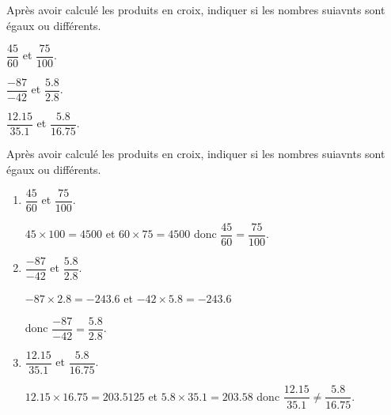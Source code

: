 \begin{exercice*}
    Après avoir calculé les produits en croix, indiquer si les nombres suiavnts sont égaux ou différents.    
    \begin{enumerate}
        \begin{spacing}{2}
            \item $\dfrac{45}{60}$ et $\dfrac{75}{100}$.
            \item $\dfrac{-87}{-42}$ et $\dfrac{\num{5.8}}{\num{2.8}}$.
            \item $\dfrac{\num{12.15}}{\num{35.1}}$ et $\dfrac{\num{5.8}}{\num{16.75}}$.        
        \end{spacing}
    \end{enumerate}   
\end{exercice*}
\begin{corrige}
    Après avoir calculé les produits en croix, indiquer si les nombres suiavnts sont égaux ou différents.

    \begin{enumerate}
        \item $\dfrac{45}{60}$ et $\dfrac{75}{100}$.
        
        {\red $45\times 100 = \num{4500}$ et $60\times 75 = \num{4500}$ donc $\dfrac{45}{60}=\dfrac{75}{100}$.}
        \item $\dfrac{-87}{-42}$ et $\dfrac{\num{5.8}}{\num{2.8}}$.
        
        {\red $-87\times\num{2.8}=\num{-243.6}$ et $-42\times\num{5.8}=\num{-243.6}$ 
        
        donc $\dfrac{-87}{-42}=\dfrac{\num{5.8}}{\num{2.8}}$.}
        \item $\dfrac{\num{12.15}}{\num{35.1}}$ et $\dfrac{\num{5.8}}{\num{16.75}}$.        
        
        {\red $\num{12.15}\times\num{16.75}=\num{203.5125}$ et $\num{5.8}\times\num{35.1}=\num{203.58}$ donc $\dfrac{\num{12.15}}{\num{35.1}} \neq \dfrac{\num{5.8}}{\num{16.75}}$.}
    \end{enumerate}
\end{corrige}

